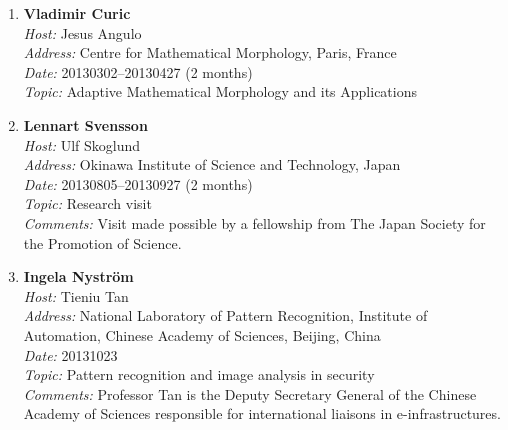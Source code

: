 \begin{enumerate}
\item 
{\bf Vladimir Curic}~\\
{\em Host:} Jesus Angulo~\\
{\em Address:} Centre for Mathematical Morphology, Paris, France~\\
{\em Date:} 20130302--20130427 (2 months)~\\
{\em Topic:} Adaptive Mathematical Morphology and its Applications

\item 
{\bf Lennart Svensson}~\\
{\em Host:} Ulf Skoglund~\\
{\em Address:} Okinawa Institute of Science and Technology, Japan~\\
{\em Date:} 20130805--20130927 (2 months)~\\
{\em Topic:} Research visit~\\
{\em Comments:} Visit made possible by a fellowship from The Japan Society for the Promotion of Science.


\item 
{\bf Ingela Nystr\"{o}m}~\\
{\em Host:} Tieniu Tan~\\
{\em Address:} National Laboratory of Pattern Recognition, Institute of Automation, Chinese Academy of Sciences, Beijing, China~\\
{\em Date:} 20131023~\\
{\em Topic:} Pattern recognition  and image analysis in security~\\
{\em Comments:} Professor Tan is the Deputy Secretary General of the Chinese Academy of Sciences responsible for international liaisons in e-infrastructures.



\end{enumerate}
